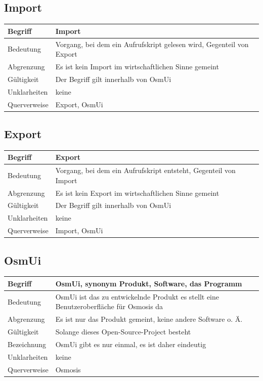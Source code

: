 \documentclass[a4paper,12pt]{scrartcl}
\begin{document}
\begin{center}
\subsection{Import}
\begin{tabular}{|p{5cm}|p{10cm}|}
\hline Begriff & \textbf{Import}\\
\hline Bedeutung & Vorgang, bei dem ein Aufrufskript gelesen wird, Gegenteil von Export \\ 
\hline Abgrenzung & Es ist kein Import im wirtschaftlichen Sinne gemeint\\ 
\hline Gültigkeit & Der Begriff gilt innerhalb von OsmUi \\ 
\hline Unklarheiten & keine \\ 
\hline Querverweise & Export, OsmUi \\ 
\hline
\end{tabular}
\subsection{Export}
\begin{tabular}{|p{5cm}|p{10cm}|}
\hline Begriff & \textbf{Export}\\
\hline Bedeutung & Vorgang, bei dem ein Aufrufskript entsteht, Gegenteil von Import \\ 
\hline Abgrenzung & Es ist kein Export im wirtschaftlichen  Sinne gemeint\\ 
\hline Gültigkeit & Der Begriff gilt innerhalb von OsmUi \\ 
\hline Unklarheiten & keine \\ 
\hline Querverweise & Import, OsmUi \\ 
\hline
\end{tabular}
\subsection{OsmUi}
\begin{tabular}{|p{5cm}|p{10cm}|}
\hline Begriff & \textbf{OsmUi}, synonym Produkt, Software, das Programm \\ 
\hline Bedeutung & OsmUi ist das zu entwickelnde Produkt es stellt eine Benutzeroberfläche für Osmosis da \\ 
\hline Abgrenzung & Es ist nur das Produkt gemeint, keine andere Software o. Ä. \\ 
\hline Gültigkeit & Solange dieses Open-Source-Project besteht \\ 
\hline Bezeichnung & OsmUi gibt es nur einmal, es ist daher eindeutig \\ 
\hline Unklarheiten & keine \\ 
\hline Querverweise & Osmosis \\ 
\hline 
\end{tabular}

\end{center}
\end{document}
